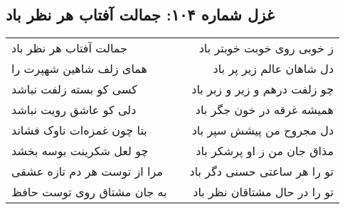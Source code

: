 \begin{center}
\section*{غزل شماره ۱۰۴: جمالت آفتاب هر نظر باد}
\label{sec:sh104}
\begin{longtable}{l p{0.5cm} r}
جمالت آفتاب هر نظر باد
&&
ز خوبی روی خوبت خوبتر باد
\\
همای زلف شاهین شهپرت را
&&
دل شاهان عالم زیر پر باد
\\
کسی کو بسته زلفت نباشد
&&
چو زلفت درهم و زیر و زبر باد
\\
دلی کو عاشق رویت نباشد
&&
همیشه غرقه در خون جگر باد
\\
بتا چون غمزه‌ات ناوک فشاند
&&
دل مجروح من پیشش سپر باد
\\
چو لعل شکرینت بوسه بخشد
&&
مذاق جان من ز او پرشکر باد
\\
مرا از توست هر دم تازه عشقی
&&
تو را هر ساعتی حسنی دگر باد
\\
به جان مشتاق روی توست حافظ
&&
تو را در حال مشتاقان نظر باد
\\
\end{longtable}
\end{center}

